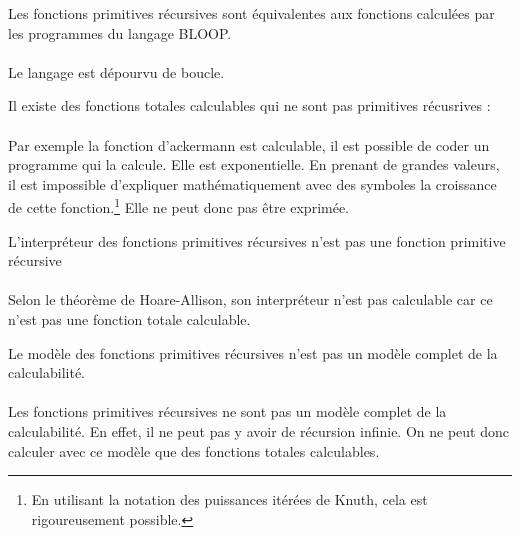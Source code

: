 \begin{myprop}
	Les fonctions primitives récursives sont équivalentes aux fonctions calculées par les programmes du langage BLOOP.
\end{myprop}
\paragraph{} Le langage est dépourvu de boucle.

\begin{myprop}
	Il existe des fonctions totales calculables qui ne sont pas primitives récusrives :
\end{myprop}
\paragraph{} Par exemple la fonction d’ackermann est calculable, il est possible de coder un programme qui la calcule. Elle est exponentielle. En prenant de grandes valeurs, il est impossible d’expliquer mathématiquement avec des symboles la croissance de cette fonction.\footnote{
En utilisant la notation des puissances itérées de Knuth, cela est rigoureusement possible.
}
Elle ne peut donc pas être exprimée.

\begin{myprop}
	L'interpréteur des fonctions primitives récursives n'est pas une fonction primitive récursive
\end{myprop}
\paragraph{} Selon le théorème de Hoare-Allison, son interpréteur n'est pas calculable car ce n'est pas une fonction totale calculable.

\begin{myprop}
	Le modèle des fonctions primitives récursives n'est pas un modèle complet de la calculabilité.
\end{myprop}
\paragraph{} Les fonctions primitives récursives ne sont pas un modèle complet de
	la calculabilité. En effet, il ne peut pas y avoir de récursion
	infinie. On ne peut donc calculer avec ce modèle que des fonctions
	totales calculables.

